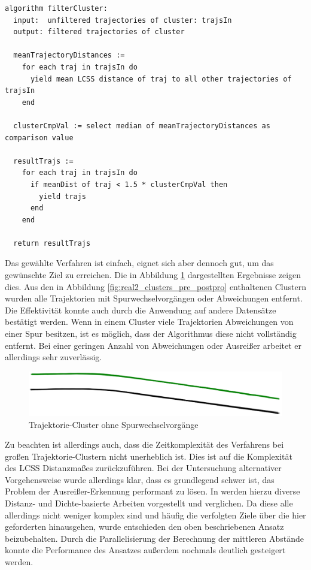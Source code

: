 \begin{lstlisting}[caption=Pseudocode Cluster Post-Processing, language=Pseudo, label=lst:pseudo_post_processing]
algorithm filterCluster:
  input:  unfiltered trajectories of cluster: trajsIn
  output: filtered trajectories of cluster

  meanTrajectoryDistances :=
    for each traj in trajsIn do
      yield mean LCSS distance of traj to all other trajectories of trajsIn
    end

  clusterCmpVal := select median of meanTrajectoryDistances as comparison value

  resultTrajs :=
    for each traj in trajsIn do
      if meanDist of traj < 1.5 * clusterCmpVal then
        yield trajs
      end
    end

  return resultTrajs
\end{lstlisting}

Das gewählte Verfahren ist einfach, eignet sich aber dennoch gut, um das gewünschte Ziel zu erreichen.
Die in Abbildung \ref{fig:real2_clusters_post_postpro} dargestellten Ergebnisse zeigen dies.
Aus den in Abbildung \ref{fig:real2_clusters_pre_postpro} enthaltenen Clustern wurden alle Trajektorien
mit Spurwechselvorgängen oder Abweichungen entfernt. Die Effektivität konnte auch durch die Anwendung
auf andere Datensätze bestätigt werden.
Wenn in einem Cluster viele Trajektorien Abweichungen von einer Spur besitzen, ist es möglich, dass der Algorithmus
diese nicht vollständig entfernt. Bei einer geringen Anzahl von Abweichungen oder Ausreißer arbeitet
er allerdings sehr zuverlässig. 

\begin{figure}[H]
    \centering
    \includegraphics[width=0.8\linewidth]{../resources/img/umsetzung/U2/Clusters_Post_Postprocessing}
    \caption{Trajektorie-Cluster ohne Spurwechselvorgänge}
    \label{fig:real2_clusters_post_postpro}
\end{figure}

Zu beachten ist allerdings auch, dass die Zeitkomplexität des Verfahrens bei großen Trajektorie-Clustern
nicht unerheblich ist. Dies ist auf die Komplexität des LCSS Distanzmaßes zurückzuführen.
Bei der Untersuchung alternativer Vorgehensweise wurde allerdings klar, dass es grundlegend schwer ist,
das Problem der Ausreißer-Erkennung performant zu lösen.
In \cite[]{Meng2018} werden hierzu diverse Distanz- und Dichte-basierte
Arbeiten vorgestellt und verglichen. Da diese alle allerdings nicht weniger komplex sind und häufig
die verfolgten Ziele über die hier geforderten hinausgehen, wurde entschieden den oben beschriebenen Ansatz
beizubehalten. Durch die Parallelisierung der Berechnung der mittleren Abstände konnte die Performance
des Ansatzes außerdem nochmals deutlich gesteigert werden.

